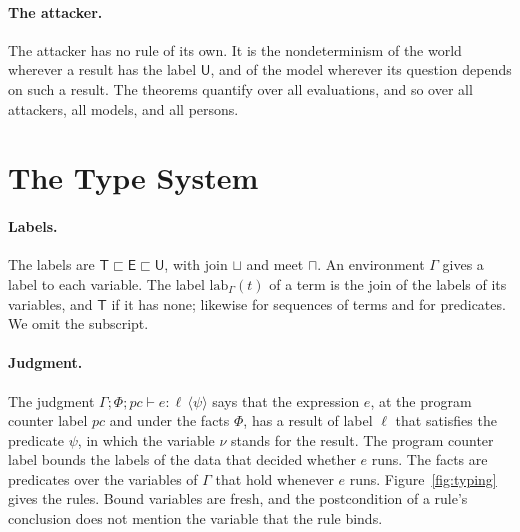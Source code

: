 \documentclass[acmsmall,nonacm,screen]{acmart}
\newcommand{\kw}[1]{\mathsf{#1}}
\newcommand{\T}{\kw{T}}
\newcommand{\E}{\kw{E}}
\newcommand{\U}{\kw{U}}
\newcommand{\lab}{\mathrm{lab}}
\newcommand{\ty}[4]{\Gamma; #1; #2 \vdash #3 : #4}
\newcommand{\post}[1]{\langle #1 \rangle}
\begin{document}
\paragraph{The attacker.} The attacker has no rule of its own. It is the nondeterminism of
the world wherever a result has the label $\U$, and of the model wherever its question
depends on such a result. The theorems quantify over all evaluations, and so over all
attackers, all models, and all persons.

\section{The Type System}
\label{sec:types}

\paragraph{Labels.} The labels are $\T \sqsubset \E \sqsubset \U$, with join $\sqcup$ and
meet $\sqcap$. An environment $\Gamma$ gives a label to each variable. The label
$\lab_\Gamma(t)$ of a term is the join of the labels of its variables, and $\T$ if it has
none; likewise for sequences of terms and for predicates. We omit the subscript.

\paragraph{Judgment.} The judgment $\ty{\Phi}{pc}{e}{\ell\,\post{\psi}}$ says that the
expression $e$, at the program counter label $pc$ and under the facts $\Phi$, has a result of
label $\ell$ that satisfies the predicate $\psi$, in which the variable $\nu$ stands for the
result. The program counter label bounds the labels of the data that decided whether $e$
runs. The facts are predicates over the variables of $\Gamma$ that hold whenever $e$ runs.
Figure~\ref{fig:typing} gives the rules. Bound variables are fresh, and the postcondition of
a rule's conclusion does not mention the variable that the rule binds.
\end{document}
